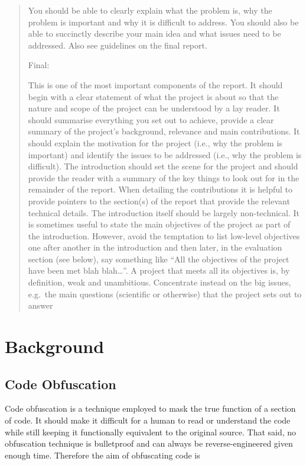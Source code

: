 \documentclass{report}
\begin{document}
\begin{quote}
You should be able to clearly explain what the problem is, why the
problem is important and why it is difficult to address. You should
also be able to succinctly describe your main idea and what issues
need to be addressed. Also see guidelines on the final report.

Final:

This is one of the most important components of the report. It
should begin with a clear statement of what the project is about so
that the nature and scope of the project can be understood by a lay
reader. It should summarise everything you set out to achieve,
provide a clear summary of the project's background, relevance and
main contributions. It should explain the motivation for the
project (i.e., why the problem is important) and identify the
issues to be addressed (i.e., why the problem is difficult). The
introduction should set the scene for the project and should
provide the reader with a summary of the key things to look out for
in the remainder of the report. When detailing the contributions it
is helpful to provide pointers to the section(s) of the report that
provide the relevant technical details. The introduction itself
should be largely non-technical. It is sometimes useful to state
the main objectives of the project as part of the introduction.
However, avoid the temptation to list low-level objectives one
after another in the introduction and then later, in the evaluation
section (see below), say something like
``All the objectives of the project have been met blah blah\ldots{}''.
A project that meets all its objectives is, by definition, weak and
unambitious. Concentrate instead on the big issues, e.g.~the main
questions (scientific or otherwise) that the project sets out to
answer

\end{quote}
\section{Background}

\subsection{Code Obfuscation}

Code obfuscation is a technique employed to mask the true function
of a section of code. It should make it difficult for a human to
read or understand the code while still keeping it functionally
equivalent to the original source. That said, no obfuscation
technique is bulletproof and can always be reverse-engineered given
enough time. Therefore the aim of obfuscating code is
\end{document}
